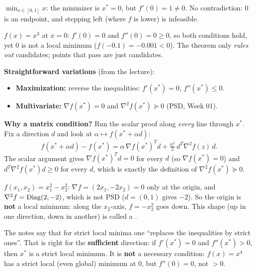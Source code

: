 \begin{example}
$\min_{x\in[0,1]}x$: the minimizer is $x^*=0$, but $f'(0)=1\ne0$. No contradiction: $0$ is an endpoint, and stepping left (where $f$ is lower) is infeasible.
\end{example}

\begin{pitfall}
$f(x)=x^3$ at $x=0$: $f'(0)=0$ and $f''(0)=0\ge0$, so both conditions hold, yet $0$ is not a local minimum ($f(-0.1)=-0.001<0$).
The theorem only \emph{rules out} candidates; points that pass are just candidates.
\end{pitfall}

\textbf{Straightforward variations} (from the lecture):
\begin{itemize}
  \item \textbf{Maximization:} reverse the inequalities: $f'(x^*)=0$, $f''(x^*)\le0$.
  \item \textbf{Multivariate:} $\nabla f(x^*)=0$ and $\nabla^2f(x^*)\succeq0$ (PSD, Week 01).
\end{itemize}

\textbf{Why a matrix condition?} Run the scalar proof along \emph{every} line through $x^*$. Fix a direction $d$ and look at $\alpha\mapsto f(x^*+\alpha d)$:
\[ f(x^*+\alpha d)-f(x^*) = \alpha\,\nabla f(x^*)^Td + \tfrac{\alpha^2}{2}\,d^T\nabla^2f(z)\,d. \]
The scalar argument gives $\nabla f(x^*)^Td=0$ for every $d$ (so $\nabla f(x^*)=0$) and $d^T\nabla^2f(x^*)d\ge0$ for every $d$, which is exactly the definition of $\nabla^2 f(x^*)\succeq0$.

\begin{example}
$f(x_1,x_2)=x_1^2-x_2^2$: $\nabla f=(2x_1,-2x_2)=0$ only at the origin, and $\nabla^2f=\operatorname{Diag}(2,-2)$, which is not PSD
($d=(0,1)$ gives $-2$). So the origin is \textbf{not} a local minimum: along the $x_2$-axis, $f=-x_2^2$ goes down. This shape (up in one direction,
down in another) is called a .
\end{example}

\begin{pitfall}
The notes say that for strict local minima one ``replaces the inequalities by strict ones''. That is right for the \textbf{sufficient} direction:
if $f'(x^*)=0$ and $f''(x^*)>0$, then $x^*$ is a strict local minimum. It is \textbf{not} a necessary condition:
$f(x)=x^4$ has a strict local (even global) minimum at $0$, but $f''(0)=0$, not $>0$.
\end{pitfall}


